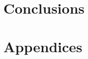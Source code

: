 \documentclass[11pt,a4paper]{report}
\theoremstyle{definition}
\numberwithin{property}{chapter}
\numberwithin{definition}{chapter}
\numberwithin{lemma}{chapter}
\numberwithin{assumption}{chapter}
\numberwithin{corollary}{chapter}
\begin{document}



\part{Conclusions}




\part{Appendices}
\appendix






\end{document}
